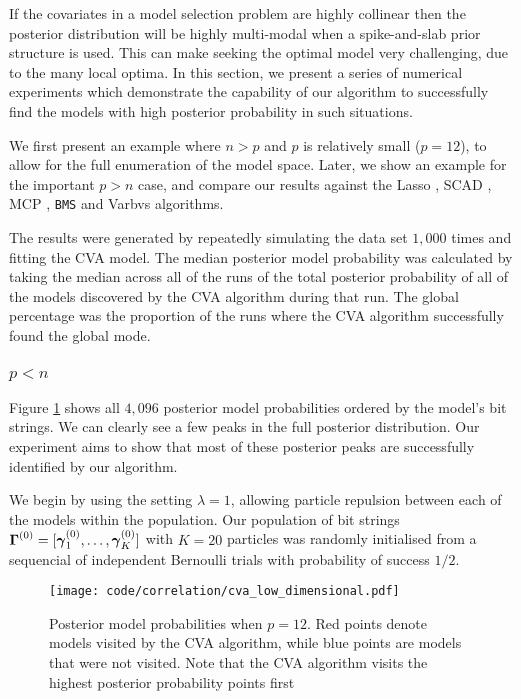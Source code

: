 If the covariates in a model selection problem are highly collinear then the posterior distribution will be
highly multi-modal when a spike-and-slab prior structure is used. This can make seeking the optimal model very
challenging, due to the many local optima. In this section, we present a series of numerical experiments which
demonstrate the capability of our algorithm to successfully find the models with high posterior probability in
such situations.

We first present an example where $n > p$ and $p$ is relatively small ($p = 12$), to allow for the full
enumeration of the model space. Later, we show an example for the important $p > n$ case, and compare our
results  against the Lasso \cite{Tibshirani1996}, SCAD \cite{Fan2001}, MCP \cite{Zhang2010}, {\tt BMS}
\cite{Zeugner2015} and Varbvs algorithms.

The results were generated by repeatedly simulating the data set $1,000$ times and fitting the CVA model.
The median posterior model probability was calculated by taking the median across all of the runs of the
total posterior probability of all of the models discovered by the CVA algorithm during that run. The global
percentage was the proportion of the runs where the CVA algorithm successfully found the global mode.

\subsubsection{$p < n$}
Figure \ref{fig:cva_posterior_models} shows all $4,096$ posterior model probabilities ordered by the model's bit
strings. We can clearly see a few peaks in the full posterior distribution. Our experiment aims to show that
most of these posterior peaks are successfully identified by our algorithm.

We begin by using the setting $\lambda = 1$, allowing particle repulsion between each of the models within the
population. Our population of bit strings ${\boldsymbol \Gamma}^{(0)} = [{\boldsymbol \gamma}_1^{(0)}, \ldots, {\boldsymbol \gamma}_K^{(0)}]$ with
$K = 20$ particles was randomly initialised from a sequencial of independent Bernoulli trials with probability
of success $1/2$.

\begin{figure}	
	\texttt{[image: code/correlation/cva\_low\_dimensional.pdf]}
	\caption{Posterior model probabilities when $p = 12$. Red points denote models visited by the CVA
						algorithm, while blue points are models that were not visited. Note that the CVA algorithm
						visits the highest posterior probability points first}
	\label{fig:cva_posterior_models}
\end{figure}

